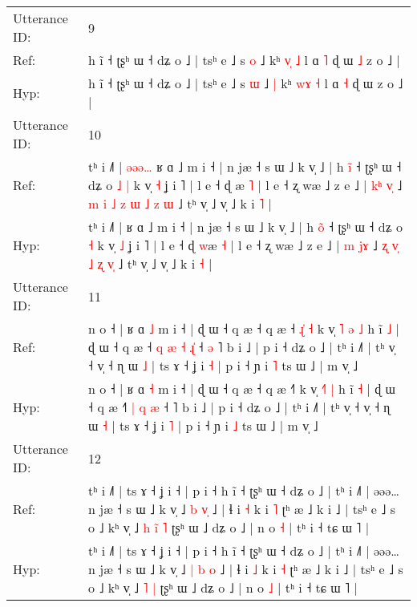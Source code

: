 \documentclass[10pt]{article}
\DeclareRobustCommand{\hl}[1]{{\textcolor{red}{#1}}}
\begin{document}
\begin{longtable}{ll}
\midrule
Utterance ID: & 9 \\
Ref: & h ĩ ˧ ʈʂʰ ɯ ˧ dʑ o ˩ | tsʰ e ˩ s \hl{o} ˩\hl{}\hl{} kʰ \hl{v}\hl{̩} \hl{˩} l ɑ \hl{˥} ɖ ɯ\hl{ }\hl{˩} z o ˩ |
 \\
Hyp: & h ĩ ˧ ʈʂʰ ɯ ˧ dʑ o ˩ | tsʰ e ˩ s \hl{ɯ} ˩\hl{ }\hl{|} kʰ \hl{w}\hl{ɤ} \hl{˧} l ɑ \hl{˧} ɖ ɯ\hl{}\hl{} z o ˩ |
 \\
\midrule
Utterance ID: & 10 \\
Ref: & tʰ i ˩˥ |\hl{ }\hl{ə}\hl{ə}\hl{ə}\hl{…} ʁ ɑ ˩ m i ˧ | n jæ ˧ s ɯ ˩ k v̩ ˩ | h \hl{i}̃ ˧ ʈʂʰ ɯ ˧ dʑ o\hl{ }\hl{˩} \hl{|} k v̩ \hl{˧} ʝ i ˥ | l e ˧ ɖ \hl{}æ \hl{˥} | l e ˧ ʐ wæ ˩ z e ˩ | \hl{k}\hl{ʰ} \hl{v}\hl{̩} ˩\hl{ }\hl{m} \hl{i} \hl{˩}\hl{ }\hl{z} \hl{ɯ} \hl{˩} \hl{z}\hl{ }\hl{ɯ} ˩ tʰ v̩ ˩ v̩ ˩ k i \hl{˥} |
 \\
Hyp: & tʰ i ˩˥ |\hl{}\hl{}\hl{}\hl{}\hl{} ʁ ɑ ˩ m i ˧ | n jæ ˧ s ɯ ˩ k v̩ ˩ | h \hl{o}̃ ˧ ʈʂʰ ɯ ˧ dʑ o\hl{}\hl{} \hl{˧} k v̩ \hl{˩} ʝ i ˥ | l e ˧ ɖ \hl{w}æ \hl{˧} | l e ˧ ʐ wæ ˩ z e ˩ | \hl{}\hl{m} \hl{j}\hl{ɤ} ˩\hl{}\hl{} \hl{ʐ} \hl{}\hl{v}\hl{̩} \hl{˩} \hl{ʐ} \hl{}\hl{v}\hl{̩} ˩ tʰ v̩ ˩ v̩ ˩ k i \hl{˧} |
 \\
\midrule
Utterance ID: & 11 \\
Ref: & n o ˧ | ʁ ɑ \hl{˩} m i ˧ | ɖ ɯ ˧ q æ ˧ q æ ˧\hl{ }\hl{ɻ}\hl{̍}\hl{ }\hl{˧} k v̩ \hl{˥}\hl{ }\hl{ə} \hl{˩} h ĩ \hl{˩} | ɖ ɯ ˧ q æ ˧\hl{ }\hl{q} \hl{æ} \hl{˧} \hl{ɻ}\hl{̍} ˧\hl{ }\hl{ə} ˥ b i ˩ | p i ˧ dʑ o ˩ | tʰ i ˩˥ | tʰ v̩ ˧ v̩ ˧ ɳ ɯ \hl{˩} | ts ɤ ˧ ʝ i \hl{˧} | p i ˧ ɲ i \hl{˥} ts ɯ ˩ | m v̩ ˩
 \\
Hyp: & n o ˧ | ʁ ɑ \hl{˧} m i ˧ | ɖ ɯ ˧ q æ ˧ q æ ˧\hl{}\hl{}\hl{}\hl{}\hl{˥} k v̩ \hl{}\hl{˧}\hl{˥} \hl{|} h ĩ \hl{˧} | ɖ ɯ ˧ q æ ˧\hl{}\hl{˥} \hl{|} \hl{q} \hl{}\hl{æ} ˧\hl{}\hl{} ˥ b i ˩ | p i ˧ dʑ o ˩ | tʰ i ˩˥ | tʰ v̩ ˧ v̩ ˧ ɳ ɯ \hl{˧} | ts ɤ ˧ ʝ i \hl{˥} | p i ˧ ɲ i \hl{˩} ts ɯ ˩ | m v̩ ˩
 \\
\midrule
Utterance ID: & 12 \\
Ref: & tʰ i ˩˥ | ts ɤ ˧ ʝ i ˧ | p i ˧ h ĩ ˧ ʈʂʰ ɯ ˧ dʑ o ˩ | tʰ i ˩˥ | əəə… n jæ ˧ s ɯ ˩ k v̩ ˩ \hl{b} \hl{}\hl{v}\hl{̩} ˩ | ɬ i \hl{˧} k i \hl{˥} ʈʰ æ ˩ k i ˩ | tsʰ e ˩ s o ˩ kʰ v̩ ˩\hl{ }\hl{h} \hl{i}\hl{̃} \hl{˥} ʈʂʰ ɯ ˩ dʑ o ˩ | n o \hl{˧} | tʰ i ˧ tɕ ɯ ˥ |
 \\
Hyp: & tʰ i ˩˥ | ts ɤ ˧ ʝ i ˧ | p i ˧ h ĩ ˧ ʈʂʰ ɯ ˧ dʑ o ˩ | tʰ i ˩˥ | əəə… n jæ ˧ s ɯ ˩ k v̩ ˩ \hl{|} \hl{b}\hl{ }\hl{o} ˩ | ɬ i \hl{˩} k i \hl{˧} ʈʰ æ ˩ k i ˩ | tsʰ e ˩ s o ˩ kʰ v̩ ˩\hl{}\hl{} \hl{}\hl{˥} \hl{|} ʈʂʰ ɯ ˩ dʑ o ˩ | n o \hl{˩} | tʰ i ˧ tɕ ɯ ˥ |
 \\

\end{longtable}
\end{document}
